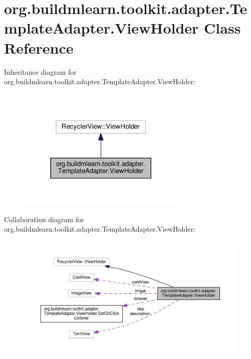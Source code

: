 \hypertarget{classorg_1_1buildmlearn_1_1toolkit_1_1adapter_1_1TemplateAdapter_1_1ViewHolder}{}\section{org.\+buildmlearn.\+toolkit.\+adapter.\+Template\+Adapter.\+View\+Holder Class Reference}
\label{classorg_1_1buildmlearn_1_1toolkit_1_1adapter_1_1TemplateAdapter_1_1ViewHolder}


Inheritance diagram for org.\+buildmlearn.\+toolkit.\+adapter.\+Template\+Adapter.\+View\+Holder\+:
\nopagebreak
\begin{figure}[H]
\begin{center}
\leavevmode
\includegraphics[width=230pt]{classorg_1_1buildmlearn_1_1toolkit_1_1adapter_1_1TemplateAdapter_1_1ViewHolder__inherit__graph}
\end{center}
\end{figure}


Collaboration diagram for org.\+buildmlearn.\+toolkit.\+adapter.\+Template\+Adapter.\+View\+Holder\+:
\nopagebreak
\begin{figure}[H]
\begin{center}
\leavevmode
\includegraphics[width=350pt]{classorg_1_1buildmlearn_1_1toolkit_1_1adapter_1_1TemplateAdapter_1_1ViewHolder__coll__graph}
\end{center}
\end{figure}
